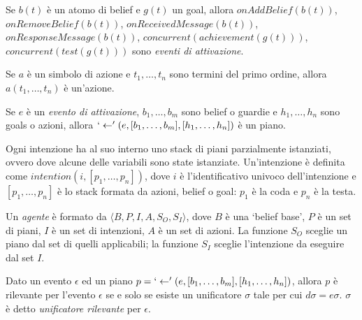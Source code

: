 \smallskip
\begin{defn}\label{defn:triggeringEvents}
Se $b(t)$ è un atomo di belief e $g(t)$ un goal, allora $onAddBelief(b(t))$, $onRemoveBelief(b(t))$, $onReceivedMessage(b(t))$, $onResponseMessage(b(t))$, $concurrent(achievement(g(t)))$, $concurrent(test(g(t)))$ sono \textit{eventi di attivazione}.
\end{defn}

\smallskip
\begin{defn}
Se $a$ è un simbolo di azione e $t_1, \ldots, t_n$ sono termini del primo ordine, allora $a(t_1, \ldots, t_n)$ è un'azione.
\end{defn}

\smallskip
\begin{defn}
Se $e$ è un \textit{evento di attivazione}, $b_1, \ldots, b_m$ sono belief o guardie e $h_1, \ldots, h_n$ sono goals o azioni, allora $`\leftarrow'(e, [b_1, \ldots, b_m], [h_1, \ldots, h_n])$ è un piano.
\end{defn}

\smallskip
\begin{defn}\label{defn:intenzione}
Ogni intenzione ha al suo interno uno stack di piani parzialmente istanziati, ovvero dove alcune delle variabili sono state istanziate. Un'intenzione è definita come $intention(i, [p_1, \ldots, p_n])$, dove $i$ è l'identificativo univoco dell'intenzione e $[p_1, \ldots,p_n]$ è lo stack formata da azioni, belief o goal: $p_1$ è la coda e $p_n$ è la testa.
\end{defn}

\smallskip
\begin{defn}
Un \textit{agente} è formato da $\langle B,P,I,A,S_O,S_I \rangle$, dove $B$ è una `belief base', $P$ è un set di piani, $I$ è un set di intenzioni, $A$ è un set di azioni. La funzione $S_O$ sceglie un piano dal set di quelli applicabili; la funzione $S_I$ sceglie l'intenzione da eseguire dal set $I$.
\end{defn}

\smallskip
\begin{defn}
Dato un evento $\epsilon$ ed un piano $p = `\leftarrow'(e, [b_1, \ldots, b_m], [h_1, \ldots, h_n])$, allora $p$ è rilevante per l'evento $\epsilon$ se e solo se esiste un unificatore $\sigma$ tale per cui $d\sigma = e\sigma$. $\sigma$ è detto \textit{unificatore rilevante} per $\epsilon$.
\end{defn}


